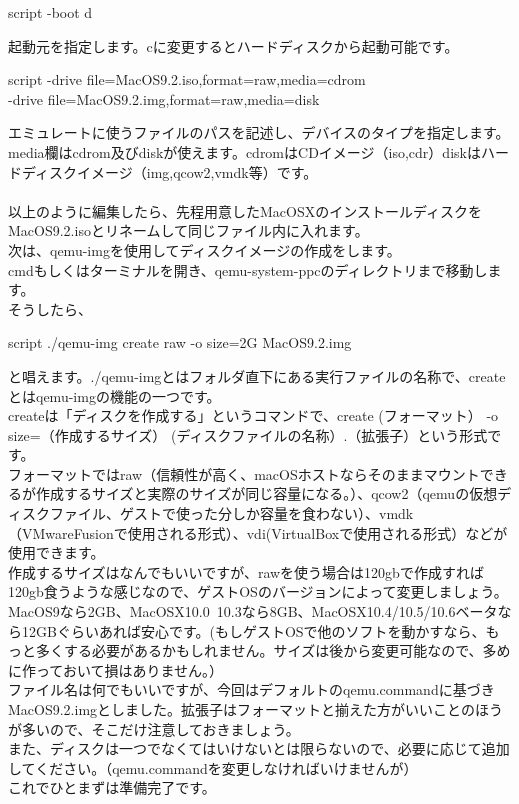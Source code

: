 \documentclass[b5paper,9pt,platex,dvipdfmx]{jsarticle}
\begin{document}
\begin{multicols*}{3}
{\begin{itembox}{script}
-boot d
\end{itembox}
起動元を指定します。cに変更するとハードディスクから起動可能です。\\
\begin{itembox}{script}
-drive file=MacOS9.2.iso,format=raw,media=cdrom \ \\
-drive file=MacOS9.2.img,format=raw,media=disk 
\end{itembox}
エミュレートに使うファイルのパスを記述し、デバイスのタイプを指定します。\\
media欄はcdrom及びdiskが使えます。cdromはCDイメージ（iso,cdr）diskはハードディスクイメージ（img,qcow2,vmdk等）です。\\
\\
以上のように編集したら、先程用意したMacOSXのインストールディスクをMacOS9.2.isoとリネームして同じファイル内に入れます。\\
次は、qemu-imgを使用してディスクイメージの作成をします。\\
cmdもしくはターミナルを開き、qemu-system-ppcのディレクトリまで移動します。\\
そうしたら、
\begin{itembox}{script}
./qemu-img create raw -o size=2G MacOS9.2.img
\end{itembox}
と唱えます。./qemu-imgとはフォルダ直下にある実行ファイルの名称で、createとはqemu-imgの機能の一つです。\\
createは「ディスクを作成する」というコマンドで、create (フォーマット） -o size=（作成するサイズ） (ディスクファイルの名称）.（拡張子）という形式です。\\
フォーマットではraw（信頼性が高く、macOSホストならそのままマウントできるが作成するサイズと実際のサイズが同じ容量になる。）、qcow2（qemuの仮想ディスクファイル、ゲストで使った分しか容量を食わない）、vmdk（VMwareFusionで使用される形式）、vdi(VirtualBoxで使用される形式）などが使用できます。\\
作成するサイズはなんでもいいですが、rawを使う場合は120gbで作成すれば120gb食うような感じなので、ゲストOSのバージョンによって変更しましょう。\\
MacOS9なら2GB、MacOSX10.0~10.3なら8GB、MacOSX10.4/10.5/10.6ベータなら12GBぐらいあれば安心です。(もしゲストOSで他のソフトを動かすなら、もっと多くする必要があるかもしれません。サイズは後から変更可能なので、多めに作っておいて損はありません。）\\
ファイル名は何でもいいですが、今回はデフォルトのqemu.commandに基づきMacOS9.2.imgとしました。拡張子はフォーマットと揃えた方がいいことのほうが多いので、そこだけ注意しておきましょう。\\
また、ディスクは一つでなくてはいけないとは限らないので、必要に応じて追加してください。（qemu.commandを変更しなければいけませんが）\\
これでひとまずは準備完了です。\\
}
\end{multicols*}
\end{document}
